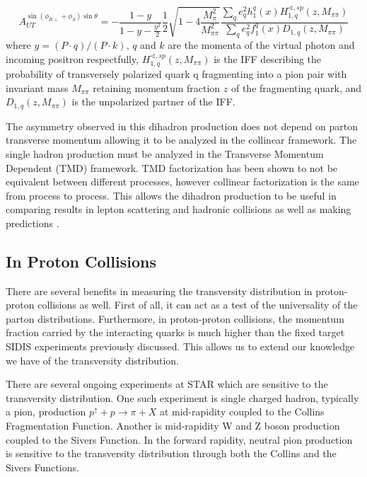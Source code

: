 \documentclass[abstract = on,listof=totoc, bibliography=totoc]{scrreprt}
\begin{document}
 \begin{equation}
A_{UT}^{\sin(\phi_{R\perp}+\phi_S)\sin\theta} = - \frac{1-y}{1-y-\frac{y^2}{2}}\frac{1}{2}\sqrt{1-4\frac{M_\pi^2}{M_{\pi\pi}^2}}\frac{\sum\limits_q e_q^2h_1^q(x)H_{1,q}^{\sphericalangle,sp}(z,M_{\pi\pi})}{\sum\limits_q e_q^2f_1^q(x)D_{1,q}(z,M_{\pi\pi})}
\end{equation}
where $y = (P\cdot q)/(P\cdot k)$, $q$ and $k$ are the momenta of the virtual photon and incoming positron respectfully, $H_{1,q}^{\sphericalangle,sp}(z,M_{\pi\pi})$ is the IFF describing the probability of transversely polarized quark q fragmenting into a pion pair with invariant mass $M_{\pi\pi}$ retaining momentum fraction $z$ of the fragmenting quark, and $D_{1,q}(z,M_{\pi\pi})$ is the unpolarized partner of the IFF. 

The asymmetry observed in this dihadron production does not depend on parton transverse momentum allowing it to be analyzed in the collinear framework. The single hadron production must be analyzed in the Transverse Momentum Dependent (TMD) framework. TMD factorization has been shown to not be equivalent between different processes, however collinear factorization is the same from process to process. This allows the dihadron production to be useful in comparing results in lepton scattering and hadronic collisions as well as making predictions \cite{univTrans}.  
  

\subsection{In Proton Collisions}
There are several benefits in measuring the transversity distribution in proton-proton collisions as well. First of all, it can act as a test of the universality of the parton distributions. Furthermore, in proton-proton collisions, the momentum fraction carried by the interacting quarks is much higher than the fixed target SIDIS experiments previously discussed. This allows us to extend our knowledge we have of the transversity distribution. 

There are several ongoing experiments at STAR which are sensitive to the transversity distribution. One such experiment is single charged hadron, typically a pion, production $p^\uparrow + p \rightarrow \pi + X$ at mid-rapidity coupled to the Collins Fragmentation Function. Another is mid-rapidity W and Z boson production coupled to the Sivers Function. In the forward rapidity, neutral pion production is sensitive to the transversity distribution through both the Collins and the Sivers Functions. 
\end{document}
